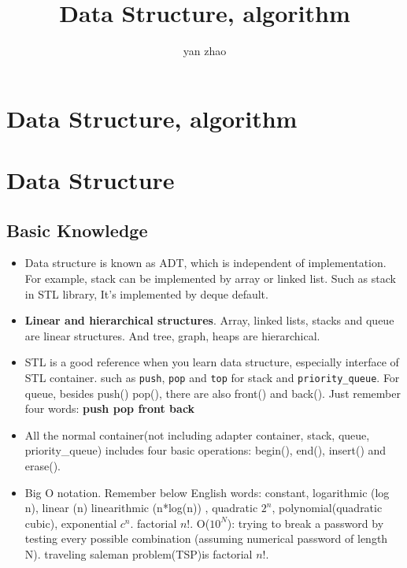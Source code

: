 \documentclass[a4paper,12pt,twoside]{book}
\begin{document}
\title{Data Structure, algorithm}
\author{yan zhao}
\date{}\maketitle

\else
\chapter{Data Structure, algorithm} 
\fi

\chapter{Data Structure}



\section{Basic Knowledge}
\begin{itemize}
\item Data structure is known as ADT,  which is independent of implementation. For example, stack can be implemented by array or linked list. Such as stack in STL library, It's implemented by deque default.   

\item \textbf{Linear and hierarchical structures}. Array, linked lists, stacks and queue are linear structures. And tree, graph, heaps are hierarchical.

\item STL is a good reference when you learn data structure, especially interface of STL container. such as \texttt{push}, \texttt{pop}  and \texttt{top} for stack and \texttt{priority\_queue}. For queue, besides push() pop(),  there are also front() and back(). Just remember four words: \textbf{push pop front back}

\item All the normal container(not including adapter container, stack, queue, priority\_queue) includes four basic operations: begin(), end(), insert() and erase(). 

\item Big O notation. Remember below English words: constant, logarithmic (log n), linear (n)  linearithmic (n*log(n)) , quadratic $2^{n}$, polynomial(quadratic cubic),  exponential $c^{n}$.  factorial $n!$.  O($10^{N}$): trying to break a password by testing every possible combination (assuming numerical password of length N).  traveling saleman problem(TSP)is factorial $n!$. 
\end{itemize}
\end{document}
